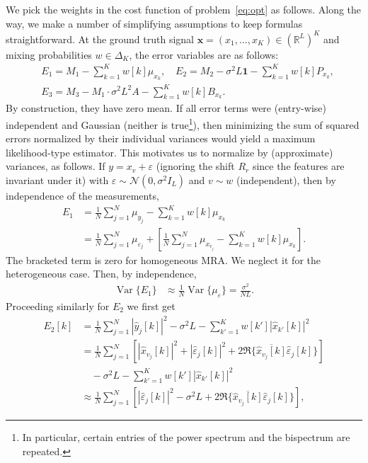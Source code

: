 \documentclass[english]{article}
\numberwithin{equation}{section}
\numberwithin{figure}{section}
\theoremstyle{plain}
\theoremstyle{definition}
\theoremstyle{remark}
\theoremstyle{plain}
\theoremstyle{remark}
\theoremstyle{plain}
\theoremstyle{plain}
\newcommand{\RL}{\mathbb{R}^L}
\newcommand{\Var}{\operatorname{Var}}
\begin{document}
We pick the weights in the cost function of problem~\eqref{eq:opt} as follows. Along the way, we make a number of simplifying assumptions to keep formulas straightforward.
At the ground truth signal $\mathbf{x} = (x_1, \ldots, x_K) \in (\RL)^K$ and mixing probabilities $w \in \Delta_K$,
the error variables are as follows:
\begin{align*}
	& E_1 = M_1 - \sum_{k=1}^{K} w[k] \mu_{x_k}, \quad
	E_2 = M_2 - \sigma^2L \mathbf{1} - \sum_{k=1}^{K} w[k] P_{x_k}, \\
	& E_3 = M_3 - M_1 \cdot \sigma^2L^2 A - \sum_{k=1}^{K} w[k] B_{x_k}.
\end{align*}
By construction, they have zero mean.
If all error terms were (entry-wise) independent and Gaussian (neither is true\footnote{In particular, certain entries of the power spectrum and the bispectrum are repeated.}), then minimizing the sum of squared errors normalized by their individual variances would yield a maximum likelihood-type estimator.
This motivates us to normalize by (approximate) variances, as follows. If $y = x_{v} + \varepsilon$
(ignoring the shift $R_{r}$ since the features are invariant under it)
with $\varepsilon \sim \mathcal{N}(0, \sigma^2 I_L)$ and $v \sim w$ (independent), then by independence of the measurements,
\begin{align*}
	E_1 & = \frac{1}{N} \sum_{j = 1}^N \mu_{y_j} - \sum_{k=1}^{K} w[k] \mu_{x_k} \\
	    & = \frac{1}{N} \sum_{j = 1}^N \mu_{\varepsilon_{j}} + \left[\frac{1}{N} \sum_{j = 1}^N \mu_{x_{v_j}} - \sum_{k=1}^{K} w[k] \mu_{x_k}\right].
\end{align*}
The bracketed term is zero for homogeneous MRA. We neglect it for the heterogeneous case. Then, by independence,
\begin{align*}
	\Var\{E_1\} & \approx \frac{1}{N} \Var\{ \mu_{\varepsilon} \} = \frac{\sigma^2}{NL}.
\end{align*}
Proceeding similarly for $E_2$ we first get
\begin{align*}
	E_2[k] & = \frac{1}{N} \sum_{j = 1}^N |\hat y_j[k]|^2 - \sigma^2L - \sum_{k'=1}^{K} w[k'] |\hat x_{k'}[k]|^2 \\
	       & = \frac{1}{N} \sum_{j = 1}^N \left[|\hat x_{v_j}[k]|^2 + |\hat \varepsilon_j[k]|^2 + 2\Re\{ \overline{\hat x_{v_j}[k]} \hat \varepsilon_j[k] \} \right] \\
	       & \quad  - \sigma^2L - \sum_{k'=1}^{K} w[k'] |\hat x_{k'}[k]|^2 \\
	       & \approx \frac{1}{N} \sum_{j = 1}^N \left[|\hat \varepsilon_j[k]|^2 - \sigma^2L + 2\Re\{ \overline{\hat x_{v_j}[k]} \hat \varepsilon_j[k] \} \right],
\end{align*}
\end{document}
